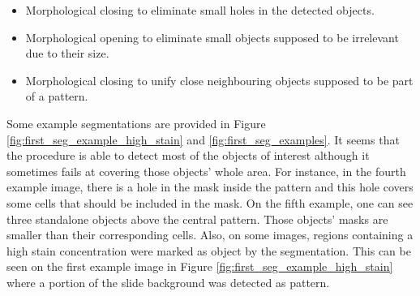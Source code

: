 \begin{itemize}
	\item Morphological closing to eliminate small holes in the detected objects.
	\item Morphological opening to eliminate small objects supposed to be irrelevant due to their size.
	\item Morphological closing to unify close neighbouring objects supposed to be part of a pattern.
\end{itemize}

Some example segmentations are provided in Figure \ref{fig:first_seg_example_high_stain} and \ref{fig:first_seg_examples}. It seems that the procedure is able to detect most of the objects of interest although it sometimes fails at covering those objects' whole area. For instance, in the fourth example image, there is a hole in the mask inside the pattern and this hole covers some cells that should be included in the mask. On the fifth example, one can see three standalone objects above the central pattern. Those objects' masks are smaller than their corresponding cells. Also, on some images, regions containing a high stain concentration were marked as object by the segmentation. This can be seen on the first example image in Figure \ref{fig:first_seg_example_high_stain} where a portion of the slide background was detected as pattern. 


